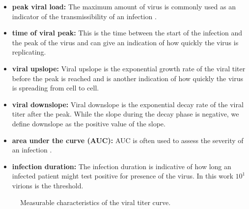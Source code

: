 \begin{itemize}
\item \textbf{peak viral load:} The maximum amount of virus is commonly used as an indicator of the transmissibility of an infection \citep{handel09}. 
\item \textbf{time of viral peak:} This is the time between the start of the infection and the peak of the virus and can give an indication of how quickly the virus is replicating.
\item \textbf{viral upslope:} Viral upslope is the exponential growth rate of the viral titer before the peak is reached and is another indication of how quickly the virus is spreading from cell to cell. 
\item \textbf{viral downslope:} Viral downslope is the exponential decay rate of the viral titer after the peak. While the slope during the decay phase is negative, we define downslope as the positive value of the slope.
\item \textbf{area under the curve (AUC):} AUC is often used to assess the severity of an infection \citep{hayden00, barroso05}.
\item \textbf{infection duration:} The infection duration is indicative of how long an infected patient might test positive for presence of the virus. In this work $10^1$ virions is the threshold.
\end{itemize}

\begin{figure}
\begin{center}
    \caption{Measurable characteristics of the viral titer curve.}
    \label{measurements}
\end{center}
\end{figure}


